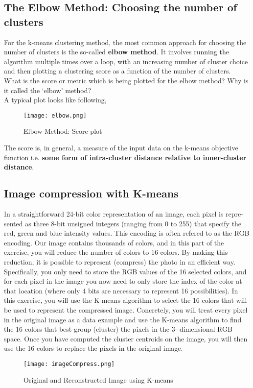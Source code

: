 	\subsection{\textbf{The Elbow Method}: Choosing the number of clusters}
		For the k-means clustering method, the most common approach for choosing the number of clusters is the so-called \textbf{elbow method}. It involves running the algorithm multiple times over a loop, with an increasing number of cluster choice and then plotting a clustering score as a function of the number of clusters.\\

		What is the score or metric which is being plotted for the elbow method? Why is it called the ‘elbow’ method?\\

		A typical plot looks like following,

		\begin{figure}[h]
			\centering
			\texttt{[image: elbow.png]}
			\caption{Elbow Method: Score plot}
		\end{figure}

		The score is, in general, a measure of the input data on the k-means objective function i.e. \textbf{some form of intra-cluster distance relative to inner-cluster distance}.

	\subsection{Image compression with K-means}
		In a straightforward 24-bit color representation of an image, each pixel is repre-
		sented as three 8-bit unsigned integers (ranging from 0 to 255) that specify
		the red, green and blue intensity values. This encoding is often refered to as
		the RGB encoding. Our image contains thousands of colors, and in this part
		of the exercise, you will reduce the number of colors to 16 colors.
		By making this reduction, it is possible to represent (compress) the photo
		in an efficient way. Specifically, you only need to store the RGB values of
		the 16 selected colors, and for each pixel in the image you now need to only
		store the index of the color at that location (where only 4 bits are necessary
		to represent 16 possibilities).
		In this exercise, you will use the K-means algorithm to select the 16 colors
		that will be used to represent the compressed image. Concretely, you will
		treat every pixel in the original image as a data example and use the K-means
		algorithm to find the 16 colors that best group (cluster) the pixels in the 3-
		dimensional RGB space. Once you have computed the cluster centroids on
		the image, you will then use the 16 colors to replace the pixels in the original
		image.

		\begin{figure}[h]
			\centering
			\texttt{[image: imageCompress.png]}
			\caption{Original and Reconstructed Image using K-means}
		\end{figure}		